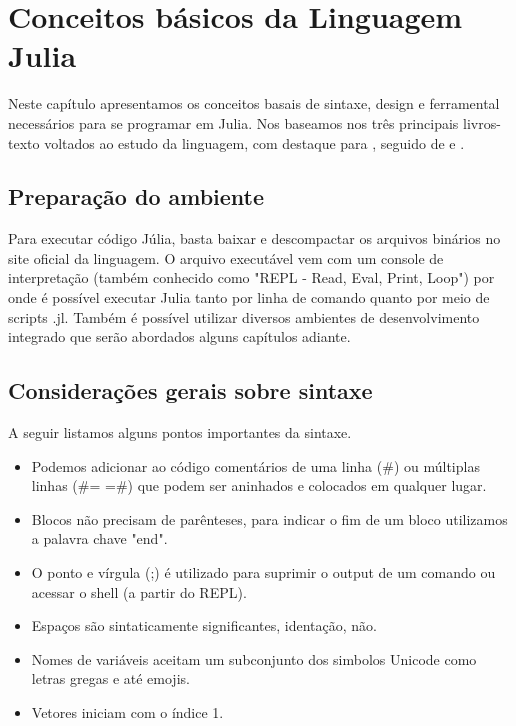 %


\chapter{ Conceitos básicos da Linguagem Julia}

Neste capítulo apresentamos os conceitos basais de sintaxe, design e ferramental necessários para se programar em Julia. Nos baseamos nos três principais livros-texto voltados ao estudo da linguagem, com destaque para \cite{Lobianco2019}, seguido de \cite{Lauwens2019} e \cite{Kwong2020}.

\section{Preparação do ambiente}
Para executar código Júlia, basta baixar e descompactar os arquivos binários no site oficial da linguagem. O arquivo executável vem com um console de interpretação (também conhecido como "REPL - Read, Eval, Print, Loop") por onde é possível executar Julia tanto por linha de comando quanto por meio de scripts .jl. Também é possível utilizar diversos ambientes de desenvolvimento integrado que serão abordados alguns capítulos adiante.

\section{Considerações gerais sobre sintaxe}
A seguir listamos alguns pontos importantes da sintaxe. 
\begin{itemize}
    \item Podemos adicionar ao código comentários de uma linha (\#) ou múltiplas linhas (\#= =\#) que podem ser aninhados e colocados em qualquer lugar.
    \item Blocos não precisam de parênteses, para indicar o fim de um bloco utilizamos a palavra chave "end". 
    \item O ponto e vírgula (;) é utilizado para suprimir o output de um comando ou acessar o shell (a partir do REPL).
    \item Espaços são sintaticamente significantes, identação, não. 
    \item Nomes de variáveis aceitam um subconjunto dos simbolos Unicode como letras gregas e até emojis. 
    \item Vetores iniciam com o índice 1. 
\end{itemize}

